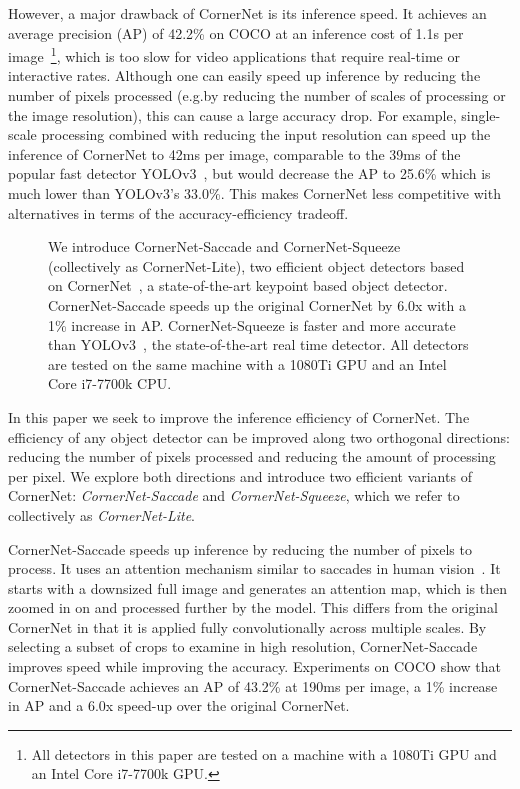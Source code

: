 \documentclass{bmvc2k}
\begin{document}
However, a major drawback of CornerNet is its inference speed. It achieves an average precision (AP) of 42.2\% on COCO at an inference cost of 1.1s per image~\footnote{All detectors in this paper are tested on a machine with a 1080Ti GPU and an Intel Core i7-7700k GPU.}, which is too slow for video applications that require real-time or interactive rates. 
Although one can easily speed up inference by reducing the number of pixels processed (e.g.\@ by reducing the number of scales of processing or the image resolution), this can cause a large accuracy drop. For example, single-scale processing combined with reducing the input resolution can speed up the inference of CornerNet to 42ms per image, comparable to the 39ms of the popular fast detector YOLOv3~\cite{redmon2018yolov3}, but would decrease the AP to 25.6\% which is much lower than YOLOv3's 33.0\%. This makes CornerNet less competitive with alternatives in terms of the accuracy-efficiency tradeoff. 

\begin{figure}
    \centering
    \caption{We introduce CornerNet-Saccade and CornerNet-Squeeze (collectively as CornerNet-Lite), two efficient object detectors based on CornerNet~\cite{law2018cornernet}, a state-of-the-art keypoint based object detector. CornerNet-Saccade speeds up the original CornerNet by 6.0x with a 1\% increase in AP. CornerNet-Squeeze is faster and more accurate than YOLOv3~\cite{redmon2018yolov3}, the state-of-the-art real time detector. All detectors are tested on the same machine with a 1080Ti GPU and an Intel Core i7-7700k CPU.}
    \label{fig:test}
\end{figure}

In this paper we seek to improve the inference efficiency of CornerNet. The efficiency of any object detector can be improved along two orthogonal directions: reducing the number of pixels processed and reducing the amount of processing per pixel. We explore both directions and introduce two efficient variants of CornerNet: \emph{CornerNet-Saccade} and \emph{CornerNet-Squeeze}, which we refer to collectively as \emph{CornerNet-Lite}. 

CornerNet-Saccade speeds up inference by reducing the number of pixels to process. It uses an attention mechanism similar to saccades in human vision~\cite{yarbus2013eye,bahill1975main}. It starts with a downsized full image and generates an attention map, which is then zoomed in on and processed further by the model. This differs from the original CornerNet in that it is applied fully convolutionally across multiple scales. By selecting a subset of crops to examine in high resolution, CornerNet-Saccade improves speed while improving the accuracy. Experiments on COCO show that CornerNet-Saccade achieves an AP of 43.2\% at 190ms per image, a 1\% increase in AP and a 6.0x speed-up over the original CornerNet. 
\end{document}
